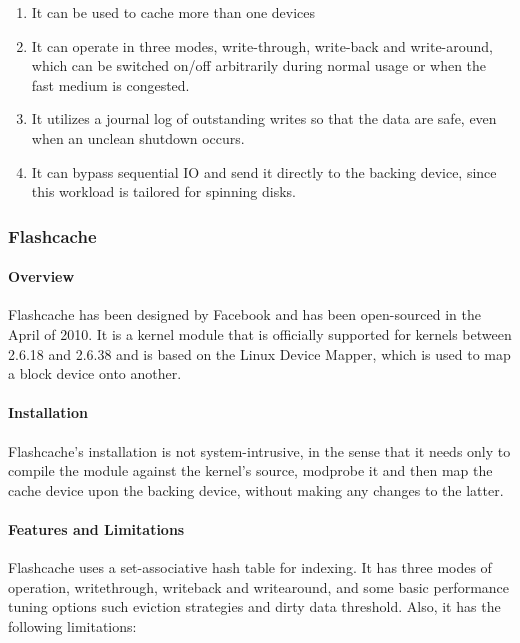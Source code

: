 \begin{enumerate}
	\item It can be used to cache more than one devices
	\item It can operate in three modes, write-through, write-back and 
		write-around, which can be switched on/off arbitrarily during normal 
		usage or when the fast medium is congested.
	\item It utilizes a journal log of outstanding writes so that the data are 
		safe, even when an unclean shutdown occurs.
	\item It can bypass sequential IO and send it directly to the backing 
		device, since this workload is tailored for spinning disks.
\end{enumerate}

\subsubsection{Flashcache}

\paragraph{Overview}

Flashcache has been designed by Facebook and has been open-sourced in the April 
of 2010. It is a kernel module that is officially supported for kernels between  
2.6.18 and 2.6.38 and is based on the Linux Device Mapper, which is used to map 
a block device onto another.

\paragraph{Installation}

Flashcache's installation is not system-intrusive, in the sense that it needs 
only to compile the module against the kernel's source, modprobe it and then 
map the cache device upon the backing device, without making any changes to the 
latter.

\paragraph{Features and Limitations}

Flashcache uses a set-associative hash table for indexing. It has three modes 
of operation, writethrough, writeback and writearound, and some basic 
performance tuning options such eviction strategies and dirty data threshold.  
Also, it has the following limitations:

